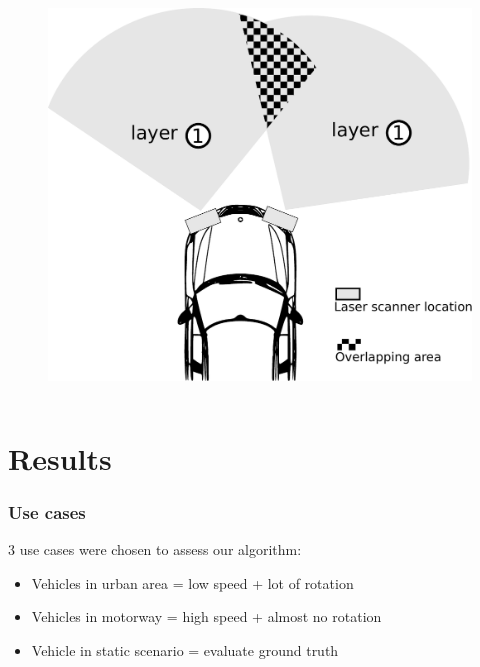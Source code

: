 \documentclass{beamer}
\begin{document}
\begin{frame}
\begin{columns}[t]
		  \begin{column}{5cm}
		  \begin{figure}[h]
			\center
			\includegraphics[scale=0.27]{../img/fig:demonstrator:superior:overlap}
		  \end{figure}   
		  \end{column}
		 \end{columns} 	
	
	\end{frame}

\section{Results}

	\begin{frame}
		\frametitle{Use cases}
		3 use cases were chosen to assess our algorithm:
		\begin{itemize}
		\item Vehicles in urban area =  low speed + lot of rotation
		\item Vehicles in motorway = high speed + almost no rotation
		\item Vehicle in static scenario = evaluate ground truth
		\end{itemize}						
	\end{frame}
\end{document}
